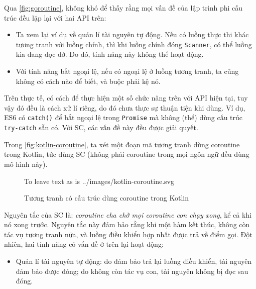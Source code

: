 \documentclass[../../thesis]{subfiles}
\begin{document}
Qua \autoref{fig:goroutine}, không khó để thấy rằng mọi vấn đề của lập trình phi
cấu trúc đều lặp lại với hai API trên:

\begin{itemize}
    \item
        Ta xem lại ví dụ về quản lí tài nguyên tự động. Nếu có luồng thực thi
        khác tương tranh với luồng chính, thì khi luồng chính đóng
        \texttt{Scanner}, có thể luồng kia đang đọc dở. Do đó, tính năng này
        không thể hoạt động.
\end{itemize}

\begin{itemize}[resume, before = \vspace*{-\dimexpr\topsep+\partopsep\relax}]
    \item
        Với tính năng bắt ngoại lệ, nếu có ngoại lệ ở luồng tương tranh, ta cũng
        không có cách nào để biết, và buộc phải kệ nó.
\end{itemize}

Trên thực tế, có cách để thực hiện một số chức năng trên với API hiện tại, tuy
vậy đó đều là cách xử lí riêng, do đó chưa thực sự thuận tiện khi dùng. Ví dụ,
ES6 có \texttt{catch()} để bắt ngoại lệ trong \texttt{Promise} mà không (thể)
dùng cấu trúc \texttt{try-catch} sẵn có. Với SC, các vấn đề này đều được giải
quyết.

Trong \autoref{fig:kotlin-coroutine}, ta xét một đoạn mã tương tranh dùng
coroutine trong Kotlin, tức dùng SC (không phải coroutine trong mọi ngôn ngữ đều
dùng mô hình này).

\begin{figure}
    \centering
     To leave text as is
        {../images/kotlin-coroutine.svg}                 %
    \vspace*{-10mm}
    \caption{Tương tranh có cấu trúc dùng coroutine trong Kotlin}
    \label{fig:kotlin-coroutine}
\end{figure}

Nguyên tắc của SC là: \emph{coroutine cha chờ mọi coroutine con chạy xong}, kể
cả khi nó xong trước. Nguyên tắc này đảm bảo rằng khi một hàm kết thúc, không
còn tác vụ tương tranh nữa, và luồng điều khiển hợp nhất được trả về điểm gọi.
Đột nhiên, hai tính năng có vấn đề ở trên lại hoạt động:

\begin{itemize}
    \item
        Quản lí tài nguyên tự động: do đảm bảo trả lại luồng điều khiển, tài
        nguyên đảm bảo được đóng; do không còn tác vụ con, tài nguyên không bị
        đọc sau đóng.
\end{itemize}
\end{document}
